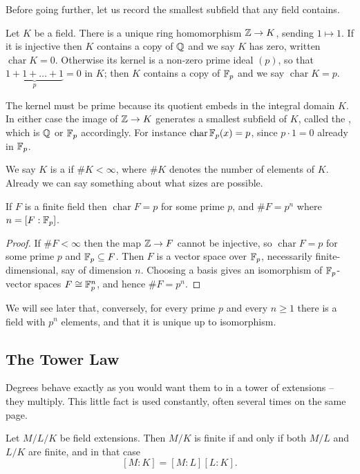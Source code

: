 \documentclass[a4paper]{scrartcl}
\newcommand{\charr}{\operatorname{char}}
\begin{document}
Before going further, let us record the smallest subfield that any field contains.

\begin{definition}[Characteristic]
	Let $K$ be a field. There is a unique ring homomorphism $\mathbb{Z} \to K$, sending $1 \mapsto 1$. If it is injective then $K$ contains a copy of $\mathbb{Q}$ and we say $K$ has  zero, written $\charr K = 0$. Otherwise its kernel is a non-zero prime ideal $(p)$, so that $\underbrace{1 + 1 + \dots + 1}_{p} = 0$ in $K$; then $K$ contains a copy of $\mathbb{F}_p$ and we say $\charr K = p$.
\end{definition}

The kernel must be prime because its quotient embeds in the integral domain $K$. In either case the image of $\mathbb{Z} \to K$ generates a smallest subfield of $K$, called the , which is $\mathbb{Q}$ or $\mathbb{F}_p$ accordingly. For instance $\charr \F_p(x) = p$, since $p \cdot 1 = 0$ already in $\mathbb{F}_p$.

We say $K$ is a  if $\#K < \infty$, where $\#K$ denotes the number of elements of $K$. Already we can say something about what sizes are possible.

\begin{lemma}
	If $F$ is a finite field then $\charr F = p$ for some prime $p$, and $\#F = p^n$ where $n = [F : \mathbb{F}_p]$.
\end{lemma}

\begin{proof}
	If $\#F < \infty$ then the map $\mathbb{Z} \to F$ cannot be injective, so $\charr F = p$ for some prime $p$ and $\mathbb{F}_p \subseteq F$. Then $F$ is a vector space over $\mathbb{F}_p$, necessarily finite-dimensional, say of dimension $n$. Choosing a basis gives an isomorphism of $\mathbb{F}_p$-vector spaces $F \cong \mathbb{F}_p^n$, and hence $\#F = p^n$.
\end{proof}

We will see later that, conversely, for every prime $p$ and every $n \geq 1$ there is a field with $p^n$ elements, and that it is unique up to isomorphism.

\subsection{The Tower Law}

Degrees behave exactly as you would want them to in a tower of extensions -- they multiply. This little fact is used constantly, often several times on the same page.

\begin{theorem}
	Let $M/L/K$ be field extensions. Then $M/K$ is finite if and only if both $M/L$ and $L/K$ are finite, and in that case
	$$[M : K] = [M : L][L : K].$$
\end{theorem}
\end{document}
